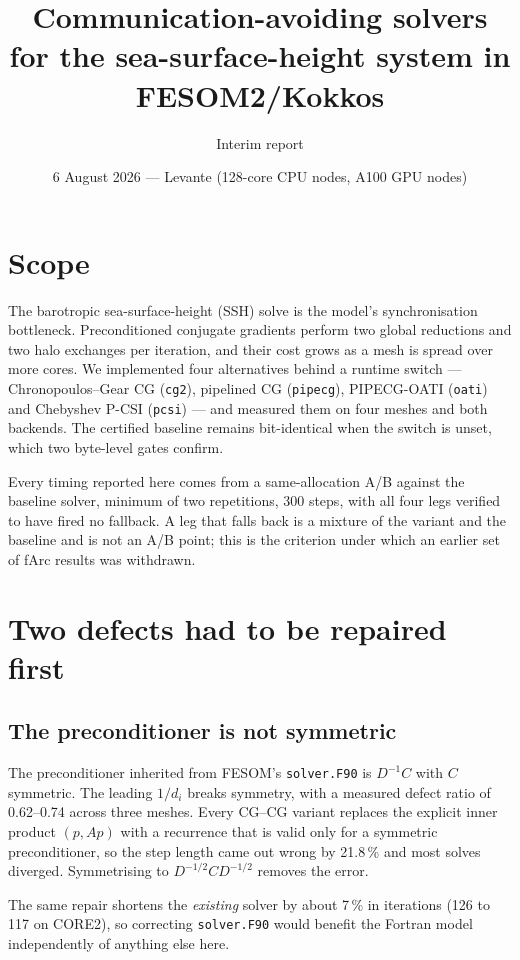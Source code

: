 \documentclass[11pt,a4paper]{article}
\title{\vspace{-12mm}\large\bfseries Communication-avoiding solvers for the sea-surface-height
system in FESOM2/Kokkos}
\author{\normalsize Interim report}
\date{\normalsize 6 August 2026 --- Levante (128-core CPU nodes, A100 GPU nodes)}
\begin{document}
\maketitle
\vspace{-6mm}

\section{Scope}

The barotropic sea-surface-height (SSH) solve is the model's synchronisation bottleneck.
Preconditioned conjugate gradients perform two global reductions and two halo exchanges per
iteration, and their cost grows as a mesh is spread over more cores. We implemented four
alternatives behind a runtime switch --- Chronopoulos--Gear CG (\texttt{cg2}), pipelined CG
(\texttt{pipecg}), PIPECG-OATI (\texttt{oati}) and Chebyshev P-CSI (\texttt{pcsi}) --- and
measured them on four meshes and both backends. The certified baseline remains bit-identical
when the switch is unset, which two byte-level gates confirm.

Every timing reported here comes from a same-allocation A/B against the baseline solver,
minimum of two repetitions, 300 steps, with all four legs verified to have fired no fallback.
A leg that falls back is a mixture of the variant and the baseline and is not an A/B point;
this is the criterion under which an earlier set of fArc results was withdrawn.

\section{Two defects had to be repaired first}

\subsection{The preconditioner is not symmetric}

The preconditioner inherited from FESOM's \texttt{solver.F90} is $D^{-1}C$ with $C$ symmetric.
The leading $1/d_i$ breaks symmetry, with a measured defect ratio of 0.62--0.74 across three
meshes. Every CG--CG variant replaces the explicit inner product $(p,Ap)$ with a recurrence
that is valid only for a symmetric preconditioner, so the step length came out wrong by
21.8\,\% and most solves diverged. Symmetrising to $D^{-1/2}CD^{-1/2}$ removes the error.

The same repair shortens the \emph{existing} solver by about 7\,\% in iterations (126 to 117
on CORE2), so correcting \texttt{solver.F90} would benefit the Fortran model independently of
anything else here.
\end{document}
